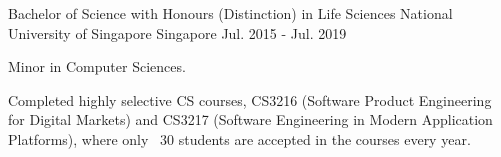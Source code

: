 

\begin{cventries}

  \cventry
    {Bachelor of Science with Honours (Distinction) in Life Sciences } %
    {National University of Singapore} %
    {Singapore} %
    {Jul. 2015 - Jul. 2019} %
    {
      \begin{cvitems} %
        \item {Minor in Computer Sciences.}
        \item {Completed highly selective CS courses, CS3216 (Software Product Engineering for Digital Markets) and CS3217 (Software Engineering in Modern Application Platforms), where only ~30 students are accepted in the courses every year.}
      \end{cvitems}
    }

\end{cventries}
